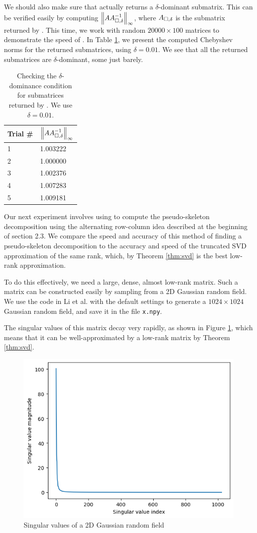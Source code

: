 \documentclass{article}
\begin{document}
	We should also make sure that \maxvol{} actually returns a $\delta$-dominant submatrix. This can be verified easily by computing $\left\lVert AA_{\square,\delta}^{-1} \right\rVert_\infty$, where $A_{\square,\delta}$ is the submatrix returned by \maxvol{}. This time, we work with random $20000\times 100$ matrices to demonstrate the speed of \maxvol{}. In Table \ref{table:delta_dominance}, we present the computed Chebyshev norms for the returned submatrices, using $\delta = 0.01$. We see that all the returned submatrices are $\delta$-dominant, some just barely.
	
	\begin{table}[h]
		\centering
		\begin{tabular}{@{}ll@{}}
			\toprule
			Trial \# & $\left\lVert AA_{\square,\delta}^{-1} \right\rVert_\infty$ \\
			\midrule
			1 & 1.003222\\
			2 & 1.000000\\
			3 & 1.002376\\
			4 & 1.007283\\
			5 & 1.009181\\
			\bottomrule
		\end{tabular}
		\caption{Checking the $\delta$-dominance condition for submatrices returned by \maxvol{}. We use $\delta = 0.01$.}
		\label{table:delta_dominance}
	\end{table}
	
	
	Our next experiment involves using \maxvol{} to compute the pseudo-skeleton decomposition using the alternating row-column idea described at the beginning of section 2.3. We compare the speed and accuracy of this method of finding a pseudo-skeleton decomposition to the accuracy and speed of the truncated SVD approximation of the same rank, which, by Theorem \ref{thm:svd} is the best low-rank approximation.
	
	To do this effectively, we need a large, dense, almost low-rank matrix. Such a matrix can be constructed easily by sampling from a 2D Gaussian random field. We use the code in Li et al. \cite{li_2023a} with the default settings to generate a $1024\times 1024$ Gaussian random field, and save it in the file \texttt{x.npy}.
	
	The singular values of this matrix decay very rapidly, as shown in Figure \ref{fig:singular_values}, which means that it can be well-approximated by a low-rank matrix by Theorem \ref{thm:svd}.
	\begin{figure}[h]
		\centering
		\includegraphics[width=0.5\linewidth]{singular_values.png}
		\caption{Singular values of a 2D Gaussian random field}
		\label{fig:singular_values}
	\end{figure}
	
\end{document}
